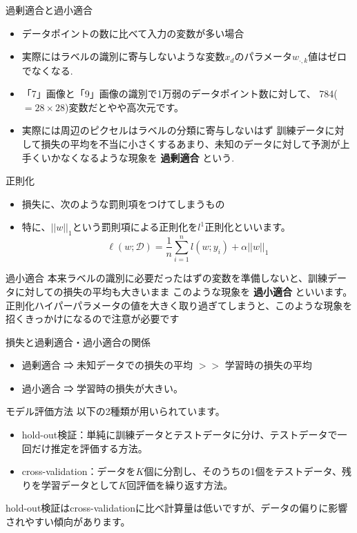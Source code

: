 \begin{frame}{過剰適合と過小適合}
\begin{itemize}
\item データポイントの数に比べて入力の変数が多い場合
  \item 実際にはラベルの識別に寄与しないような変数$x_d$のパラメータ$w_{\cdot,k}$値はゼロでなくなる.
  \item 「7」画像と「9」画像の識別で1万弱のデータポイント数に対して、
     784($=28\times28$)変数だとやや高次元です。
  \item 実際には周辺のピクセルはラベルの分類に寄与しないはず
訓練データに対して損失の平均を不当に小さくするあまり、未知のデータに対して予測が上手くいかなくなるような現象を \textbf{過剰適合} という.
\end{itemize}
\end{frame}

\begin{frame}{正則化}
\begin{itemize}
\item 損失に、次のような罰則項をつけてしまうもの
\item 特に、$||w||_1$という罰則項による正則化を$l^1$正則化といいます。
$$
\displaystyle \ell(w;\mathcal{D}) = \frac{1}{n}\sum_{i=1}^{n}l(w;y_i)+\alpha||w||_1
$$
\end{itemize}
\end{frame}

\begin{frame}{過小適合}
本来ラベルの識別に必要だったはずの変数を準備しないと、訓練データに対しての損失の平均も大きいまま
このような現象を \textbf{過小適合} といいます。
正則化ハイパーパラメータの値を大きく取り過ぎてしまうと、このような現象を招くきっかけになるので注意が必要です
\end{frame}

\begin{frame}{損失と過剰適合・過小適合の関係}
\begin{itemize}
\item 過剰適合 ⇒ 未知データでの損失の平均 $>>$ 学習時の損失の平均
\item 過小適合 ⇒ 学習時の損失が大きい。
  \end{itemize}
\end{frame}

\begin{frame}{モデル評価方法}
以下の2種類が用いられています。
\begin{itemize}
\item hold-out検証：単純に訓練データとテストデータに分け、テストデータで一回だけ推定を評価する方法。
\item cross-validation：データを$K$個に分割し、そのうちの1個をテストデータ、残りを学習データとして$K$回評価を繰り返す方法。
\end{itemize}

hold-out検証はcross-validationに比べ計算量は低いですが、データの偏りに影響されやすい傾向があります。
\end{frame}

